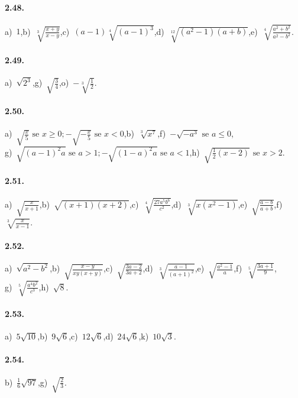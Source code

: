 \paragraph{2.48.}
a)~$1$,\quad b)~$\sqrt[3]{\frac{x+y}{x-y}}$,\quad c)~$(a-1)\sqrt[4]{(a-1)^3}$,\quad d)~$\sqrt[12]{(a^2-1)(a+b)}$,\quad e)~$\sqrt[4]{\frac{a^2+b^2}{a^2-b^2}}$. %

\paragraph{2.49.}
a)~$\sqrt{2^3}$,\quad g)~$\sqrt{\frac 3 4}$,\quad o)~$-\sqrt[3]{\frac 1 2}$.

\paragraph{2.50.}
a)~$\sqrt{\frac{x}{5}} \text{ se }x\ge 0; -\sqrt{-\frac{x}{5}}\text{ se }x<0 $,\quad b)~$\sqrt[3]{x^7}$,\quad f)~$-\sqrt{-a^3} \text{ se }a\le 0$,\protect\\
g)~$\sqrt{(a-1)^2a} \text{ se } a>1; -\sqrt{(1-a)^{2}a} \text{ se }a<1$,\quad h)~$\sqrt{\frac{1}{2}(x-2)}\text{ se } x>2$.

\paragraph{2.51.}
a)~$\sqrt{\frac{x}{x+1}}$,\quad b)~$\sqrt{(x+1)(x+2)}$,\quad c)~$\sqrt[4]{\frac{27a^5b^6}{c^2}}$,\quad d)~$\sqrt[3]{x(x^2-1)}$,\quad e)~$\sqrt{\frac{a-b}{a+b}}$,\quad f)~$\sqrt[3]{\frac{x}{x-1}}$.

\paragraph{2.52.}
a)~$\sqrt{a^2-b^2}$,\quad b)~$\sqrt{\frac{x-y}{xy(x+y)}}$,\quad c)~$\sqrt{\frac{3a-2}{3a+2}}$,\quad d)~$\sqrt[3]{\frac{a-1}{(a+1)^2}}$,\quad e)~$\sqrt{\frac{a^2-1}{a}}$,\quad f)~$\sqrt[5]{\frac{3a+1}{9}}$,\protect\\
\quad g)~$\sqrt[5]{\frac{a^4b^2}{c^3}}$,\quad h)~$\sqrt{8}$.

\paragraph{2.53.}
a)~$5\sqrt{10}$,\quad b)~$9\sqrt 6$,\quad c)~$12\sqrt 6$,\quad d)~$24\sqrt 6$,\quad k)~$10\sqrt 3$.

\paragraph{2.54.}
b)~$\frac 1 6\sqrt{97}$,\quad g)~$\sqrt{\frac 2 3}$.

